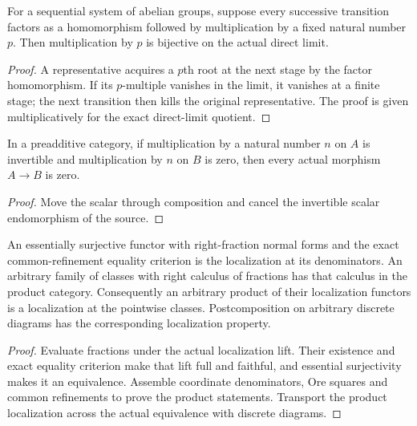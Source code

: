 \begin{proposition}
  \label{prop:scalar-invertible-direct-limit}
  \leanok
  For a sequential system of abelian groups, suppose every successive transition factors as a homomorphism followed by multiplication by a fixed natural number $p$. Then multiplication by $p$ is bijective on the actual direct limit.
\end{proposition}
\begin{proof}
  A representative acquires a $p$th root at the next stage by the factor homomorphism. If its $p$-multiple vanishes in the limit, it vanishes at a finite stage; the next transition then kills the original representative. The proof is given multiplicatively for the exact direct-limit quotient.
  \leanok
\end{proof}

\begin{proposition}
  \label{prop:scalar-orthogonality}
  \leanok
  In a preadditive category, if multiplication by a natural number $n$ on $A$ is invertible and multiplication by $n$ on $B$ is zero, then every actual morphism $A\to B$ is zero.
\end{proposition}
\begin{proof}
  Move the scalar through composition and cancel the invertible scalar endomorphism of the source.
  \leanok
\end{proof}

\begin{proposition}
  \label{prop:arbitrary-product-fraction-localization}
  \leanok
  An essentially surjective functor with right-fraction normal forms and the exact common-refinement equality criterion is the localization at its denominators. An arbitrary family of classes with right calculus of fractions has that calculus in the product category. Consequently an arbitrary product of their localization functors is a localization at the pointwise classes. Postcomposition on arbitrary discrete diagrams has the corresponding localization property.
\end{proposition}
\begin{proof}
  Evaluate fractions under the actual localization lift. Their existence and exact equality criterion make that lift full and faithful, and essential surjectivity makes it an equivalence. Assemble coordinate denominators, Ore squares and common refinements to prove the product statements. Transport the product localization across the actual equivalence with discrete diagrams.
  \leanok
\end{proof}

